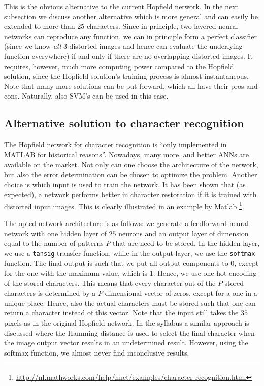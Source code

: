 \documentclass[pdftex,11pt,a4paper]{article}
\begin{document}
This is the obvious alternative to the current Hopfield network. In the next subsection we discuss another alternative which is more general and can easily be extended to more than $25$ characters. Since in principle, two-layered neural networks can reproduce any function, we can in principle form a perfect classifier (since we know \textit{all} 3 distorted images and hence can evaluate the underlying function everywhere) if and only if there are no overlapping distorted images. It requires, however, much more computing power compared to the Hopfield solution, since the Hopfield solution's training process is almost instantaneous. Note that many more solutions can be put forward, which all have their pros and cons. Naturally, also SVM's can be used in this case.

\subsection{Alternative solution to character recognition}
The Hopfield network for character recognition is ``only implemented in MATLAB for historical reasons''. Nowadays, many more, and better ANNs are available on the market. Not only can one choose the architecture of the network, but also the error determination can be chosen to optimize the problem. Another choice is which input is used to train the network. It has been shown that (as expected), a network performs better in character restoration if it is trained with distorted input images. This is clearly illustrated in an example by Matlab \footnote{\url{http://nl.mathworks.com/help/nnet/examples/character-recognition.html}}.

The opted network architecture is as follows: we generate a feedforward neural network with one hidden layer of $25$ neurons and an output layer of dimension equal to the number of patterns $P$ that are need to be stored. In the hidden layer, we use a \texttt{tansig} transfer function, while in the output layer, we use the \texttt{softmax} function. The final output is such that we put all output components to 0, except for the one with the maximum value, which is 1. Hence, we use one-hot encoding of the stored characters. This means that every character out of the $P$ stored characters is determined by a $P$-dimensional vector of zeros, except for a one in a unique place. Hence, also the actual characters must be stored such that one can return a character instead of this vector.  Note that the input still takes the $35$ pixels as in the original Hopfield network. In the syllabus a similar approach is discussed where the Hamming distance is used to select the final character when the image output vector results in an undetermined result. However, using the softmax function, we almost never find inconclusive results. 
\end{document}
